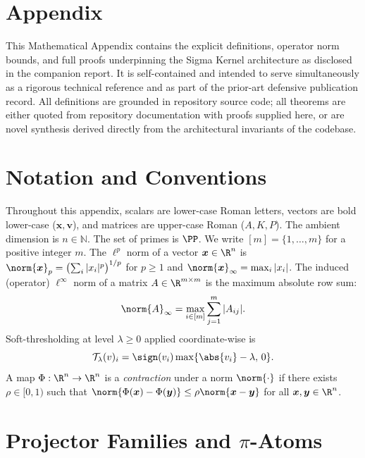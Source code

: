 \documentclass[11pt]{article}
\begin{document}
\section*{Appendix}
\appendix
This Mathematical Appendix contains the explicit definitions, operator norm
bounds, and full proofs underpinning the Sigma Kernel architecture as
disclosed in the companion report.  It is self-contained and intended to serve
simultaneously as a rigorous technical reference and as part of the prior-art
defensive publication record.  All definitions are grounded in repository
source code; all theorems are either quoted from repository documentation with
proofs supplied here, or are novel synthesis derived directly from the
architectural invariants of the codebase.

\section{Notation and Conventions}

Throughout this appendix, scalars are lower-case Roman letters, vectors are
bold lower-case ($\bm{x},\bm{v}$), and matrices are upper-case Roman
($A,K,P$).  The ambient dimension is $n \in \mathbb{N}$.  The set of primes is
$\PP$.  We write $[m] = \{1,\dots,m\}$ for a positive integer $m$.  The
$\ell^p$ norm of a vector $\bm{x}\in\R^n$ is
$\norm{\bm{x}}_p = \bigl(\sum_i |x_i|^p\bigr)^{1/p}$ for $p\geq 1$ and
$\norm{\bm{x}}_\infty = \max_i |x_i|$.  The induced (operator) $\ell^\infty$
norm of a matrix $A\in\R^{m\times m}$ is the maximum absolute row sum:
\[
  \norm{A}_\infty = \max_{i\in[m]} \sum_{j=1}^m |A_{ij}|.
\]
Soft-thresholding at level $\lambda\geq 0$ applied coordinate-wise is
\[
  \mathcal{T}_\lambda(v)_i = \sign(v_i)\max\{\abs{v_i}-\lambda,\,0\}.
\]
A map $\Phi:\R^n\to\R^n$ is a \emph{contraction} under a norm
$\norm{\cdot}$ if there exists $\rho \in [0,1)$ such that
$\norm{\Phi(\bm{x})-\Phi(\bm{y})} \leq \rho\norm{\bm{x}-\bm{y}}$
for all $\bm{x},\bm{y}\in\R^n$.

\section{Projector Families and $\pi$-Atoms}
\end{document}
